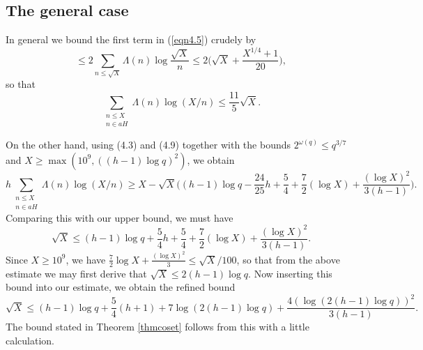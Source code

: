 \documentclass [12pt]{amsart}
\numberwithin{equation}{section}
\begin{document}


\subsection{The general case}
In general we bound the first term in (\ref{eqn4.5}) crudely by
\begin{equation*}  
\le 2 \sum_{n\leq \sqrt{X}} \Lambda(n)\log\frac{\sqrt{X}}{n} 
\le 2\Big(\sqrt{X} + \frac{X^{1/4}+1}{20}\Big), 
\end{equation*}
so that 
\begin{equation*}
\sum_{\substack {{n\le X } \\ {n\in aH} } } \Lambda(n) \log (X/n) 
\le \frac{11}{5} \sqrt{X}. 
\end{equation*}

On the other hand, using (4.3) and (4.9) together with the bounds $2^{\omega(q)} \le q^{3/7}$ and 
$X\ge \max(10^9, ((h-1)\log q)^2)$,  we obtain 
$$ 
h \sum_{\substack {{n\le X } \\ {n\in aH} } } \Lambda(n) \log (X/n) \ge X- \sqrt{X} \Big( (h-1)\log q - \frac{24}{25}h +\frac 54 
+ \frac 72 (\log X) + \frac{(\log X)^2}{3(h-1)}\Big). 
$$
Comparing this with our upper bound, we must have 
$$ 
\sqrt{X} \le (h-1)\log q + \frac 54 h + \frac 54 +\frac{7}{2} (\log X) + \frac{(\log X)^2}{3(h-1)}.
$$ 
Since $X\ge 10^9$, we have $\frac 72 \log X+ \frac{(\log X)^2}{3} \le \sqrt{X}/100$, so that from the 
above estimate we may first derive that $\sqrt{X} \le 2(h-1) \log q$.  Now inserting this bound into our 
estimate, we obtain the refined bound 
$$ 
\sqrt{X} \le (h-1) \log q + \frac 54(h+1) + 7 \log (2(h-1)\log q) + \frac{4 (\log (2(h-1)\log q))^2}{3(h-1)}. 
$$ 
The bound stated in Theorem \ref{thmcoset} follows from this with a little calculation. 

\end{document}
